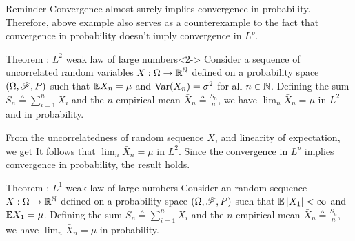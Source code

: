 \documentclass[12pt,aspectratio=169]{beamer}
\begin{document}
\begin{frame}
\begin{block}{Reminder}
Convergence almost surely implies convergence in probability. 
Therefore, above example also serves as a counterexample to the fact that convergence in probability doesn't imply convergence in $L^p$.
\end{block}
\begin{block}{Theorem : $L^2$ weak law of large numbers}<2-> 
Consider a sequence of uncorrelated random variables $X:\Omega\to\mathbb{R}^{\mathbb{N}}$ defined on a probability space $(\Omega,\mathscr{F}, P)$ such that $\mathbb{E} X_n = \mu$ and $\operatorname{Var}(X_n) = \sigma^2$ for all $n \in \mathbb{N}$. 
Defining the sum $S_n\triangleq \sum_{i=1}^nX_i$ and the $n$-empirical mean $\bar{X}_n \triangleq \frac{S_n}{n}$, 
we have $\lim_n\bar{X}_n=\mu$ in $L^2$ and in probability.
\end{block}
\end{frame}

\begin{frame}
\begin{Proof} 
From the uncorrelatedness of random sequence $X$, 
and linearity of expectation, we get
It follows that $\lim_n\bar{X}_n = \mu$ in $L^2$. 
Since the convergence in $L^p$ implies convergence in probability, the result holds.
\end{Proof}
\end{frame}

\begin{frame}
\begin{block}{Theorem : $L^1$ weak law of large numbers} 
Consider an \iid random sequence $X:\Omega\to\mathbb{R}^{\mathbb{N}}$ defined on a probability space $(\Omega,\mathscr{F}, P)$ such that $\mathbb{E}\left\lvert X_1\right\rvert< \infty$ and $\mathbb{E} X_1 = \mu$. 
Defining the sum $S_n\triangleq \sum_{i=1}^nX_i$ and the $n$-empirical mean $\bar{X}_n \triangleq \frac{S_n}{n}$, 
we have $\lim_n\bar{X}_n=\mu$ in probability.
\end{block}
\end{frame}
\end{document}
